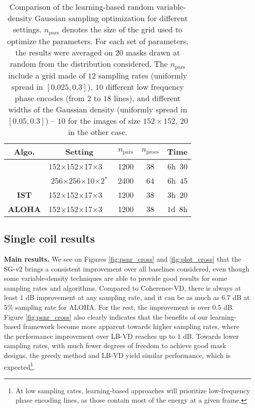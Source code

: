 \begin{table}[!t]
\centering
  
  \begin{tabular}{>{\bfseries}c cccr}
  	\toprule
	Algo. & Setting  & $n_{\text{pars}}$  & $n_{\text{procs}}$ & Time \\
	\midrule
	  \multirow{2}{*}{KTF}  & 152$\times$152$\times$17$\times$3~~ & 1200  &38 & $6$h~$30$ \\
	  					    & 256$\times$256$\times$10$\times$2$^*$ & 2400  &64 & $6$h~$45$ \\ \cmidrule(l){2-5}
	IST  					& 152$\times$152$\times$17$\times$3~~ & 1200 &38 & $3$h~$20$\\ \cmidrule(l){2-5}
	ALOHA 				    & 152$\times$152$\times$17$\times$3~~ & 1200  &38 & $1$d~$8$h\\
	\bottomrule
  \end{tabular}
  \caption{Comparison of the learning-based random variable-density Gaussian sampling optimization for different settings. $n_{\text{pars}}$ denotes the size of the grid used to optimize the parameters. For each set of parameters, the results were averaged on $20$ masks drawn at random from the distribution considered. The $n_{\text{pars}}$ include a grid made of $12$ sampling rates (uniformly spread in $[0.025,0.3]$), $10$ different low frequency phase encodes (from $2$ to $18$ lines), and different widths of the Gaussian density (uniformly spread in $[0.05, 0.3]$) -- $10$ for the images of size $152\times 152$, 
  $20$ in the other case. }\label{tab:LB-VD}
\end{table}


\FloatBarrier
\subsection{Single coil results}\label{sec:baseline_main} 



\textbf{Main results.} We see on Figures \ref{fig:psnr_cross} and \ref{fig:plot_cross} that the SG-v2 brings a consistent improvement over all baselines considered, even though some variable-density techniques are able to provide good results for some sampling rates and algorithms. Compared to Coherence-VD, there is always at least $1$ dB improvement at any sampling rate, and it can be as much as $6.7$ dB at $5\%$ sampling rate for ALOHA. For the rest, the improvement is over $0.5$ dB. Figure \ref{fig:psnr_cross} also clearly indicates that the benefits of our learning-based framework become more apparent towards higher sampling rates, where the performance improvement over LB-VD reaches up to $1$ dB. Towards lower sampling rates, with much fewer degrees of freedom to achieve good mask designs, the greedy method and LB-VD yield similar performance, which is expected\footnote{At low sampling rates, learning-based approaches will prioritize low-frequency phase encoding lines, as those contain most of the energy at a given frame.}. 


